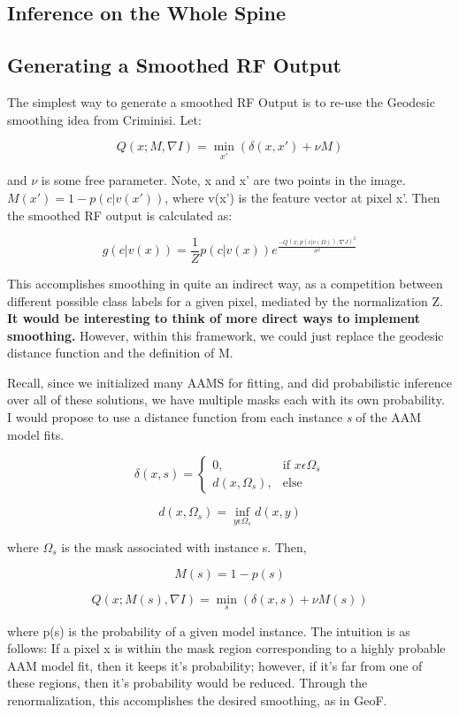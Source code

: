 \documentclass[10pt,twocolumn,letterpaper]{article}
\begin{document}
\subsection{Inference on the Whole Spine}


\subsection{Generating a Smoothed RF Output}

The simplest way to generate a smoothed RF Output is to re-use the Geodesic smoothing idea from Criminisi.  Let:

\[ Q(x; M, \nabla I) = \min_{x'} (\delta (x,x') + \nu M) \]

and $\nu$ is some free parameter.  Note, x and x' are two points in the image. $M(x') = 1 - p(c|v(x'))$, where v(x') is the feature vector at pixel x'.  Then the smoothed RF output is calculated as:

\[ g(c|v(x)) = \frac{1}{Z} p(c|v(x)) e^{\frac{-Q(x;p(c|v(\Omega)),\nabla J)^2}{\sigma ^2}} \]

This accomplishes smoothing in quite an indirect way, as a competition between different possible class labels for a given pixel, mediated by the normalization Z.  \textbf{It would be interesting to think of more direct ways to implement smoothing.}  However, within this framework, we could just replace the geodesic distance function and the definition of M.

Recall, since we initialized many AAMS for fitting, and did probabilistic inference over all of these solutions, we have multiple masks each with its own probability.  I would propose to use a distance function from each instance \emph{s} of the AAM model fits.

\[ \delta (x,s) = \begin{cases} 0, & \mbox{if } x \epsilon \Omega _s \\ d(x, \Omega _s), & \mbox{else} \end{cases} \]

\[ d(x,\Omega _s) = \inf_{y \epsilon \Omega _s} d(x,y) \]

where $\Omega _s$ is the mask associated with instance s.  Then, 

\[ M(s) = 1 - p(s) \] 

\[ Q(x; M(s), \nabla I) = \min_{s} (\delta (x,s) + \nu M(s)) \]

where p(s) is the probability of a given model instance.  The intuition is as follows: If a pixel x is within the mask region corresponding to a highly probable AAM model fit, then it keeps it's probability; however, if it's far from one of these regions, then it's probability would be reduced.  Through the renormalization, this accomplishes the desired smoothing, as in GeoF.
\end{document}
